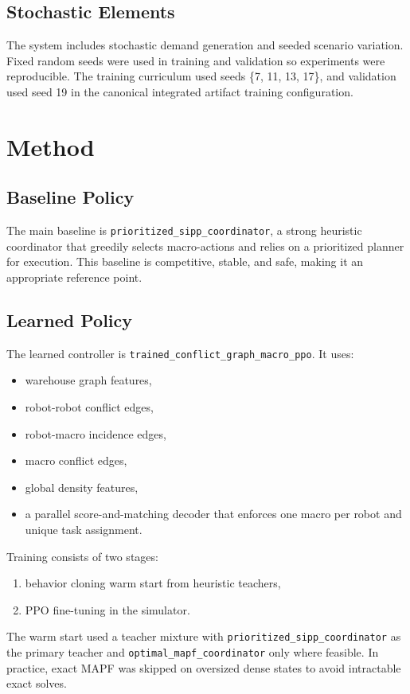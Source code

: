 \documentclass[11pt]{article}
\begin{document}
\subsection{Stochastic Elements}
The system includes stochastic demand generation and seeded scenario variation. Fixed random seeds were used in training and validation so experiments were reproducible. The training curriculum used seeds \{7, 11, 13, 17\}, and validation used seed 19 in the canonical integrated artifact training configuration.

\section{Method}
\subsection{Baseline Policy}
The main baseline is \texttt{prioritized\_sipp\_coordinator}, a strong heuristic coordinator that greedily selects macro-actions and relies on a prioritized planner for execution. This baseline is competitive, stable, and safe, making it an appropriate reference point.

\subsection{Learned Policy}
The learned controller is \texttt{trained\_conflict\_graph\_macro\_ppo}. It uses:
\begin{itemize}[leftmargin=1.5em]
    \item warehouse graph features,
    \item robot-robot conflict edges,
    \item robot-macro incidence edges,
    \item macro conflict edges,
    \item global density features,
    \item a parallel score-and-matching decoder that enforces one macro per robot and unique task assignment.
\end{itemize}

Training consists of two stages:
\begin{enumerate}[leftmargin=1.5em]
    \item behavior cloning warm start from heuristic teachers,
    \item PPO fine-tuning in the simulator.
\end{enumerate}

The warm start used a teacher mixture with \texttt{prioritized\_sipp\_coordinator} as the primary teacher and \texttt{optimal\_mapf\_coordinator} only where feasible. In practice, exact MAPF was skipped on oversized dense states to avoid intractable exact solves.
\end{document}
